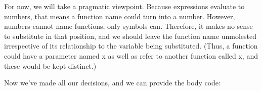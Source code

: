For now, we will take a pragmatic viewpoint. Because expressions evaluate to
numbers, that means a function name could turn into a number. However, numbers
cannot name functions, only symbols can. Therefore, it makes no sense to
substitute in that position, and we should leave the function name unmolested
irrespective of its relationship to the variable being substituted. (Thus, a
function could have a parameter named x as well as refer to another function
called x, and these would be kept distinct.)

Now we’ve made all our decisions, and we can provide the body code:

